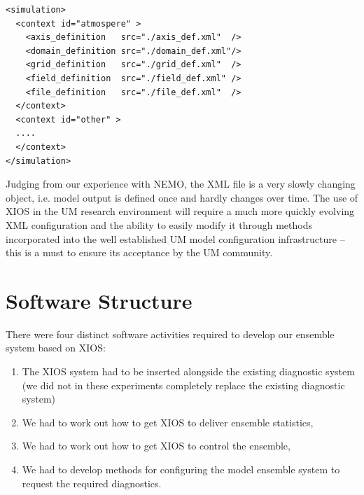 \documentclass[twocolumn, 5p, times]{elsarticle}
\begin{document}
\begin{verbatim}
<simulation>
  <context id="atmospere" >
    <axis_definition   src="./axis_def.xml"  />
    <domain_definition src="./domain_def.xml"/>
    <grid_definition   src="./grid_def.xml"  />
    <field_definition  src="./field_def.xml" />
    <file_definition   src="./file_def.xml"  />
  </context>
  <context id="other" >
  ....
  </context>
</simulation>
\end{verbatim}

Judging from our experience with NEMO, the XML file is a very slowly changing object, i.e. model output is defined once and hardly changes over time. The use of XIOS in the UM research environment will require a much more quickly evolving XML configuration and the ability to easily modify it through methods incorporated into the well established UM model configuration infrastructure -- this is a must to ensure its acceptance by the UM community. 


\section{Software Structure}
\label{software}

There were four distinct software activities required to develop our ensemble system based on XIOS:
\begin{enumerate}
\item The XIOS system had to be inserted alongside the existing diagnostic system (we did not in these experiments completely replace the existing diagnostic system) 
\item We had to work out how to get XIOS to deliver ensemble statistics,
\item We had to work out how to get XIOS to control the ensemble,
\item We had to develop methods for configuring the model ensemble system to request the required diagnostics.
\end{enumerate}
\end{document}
